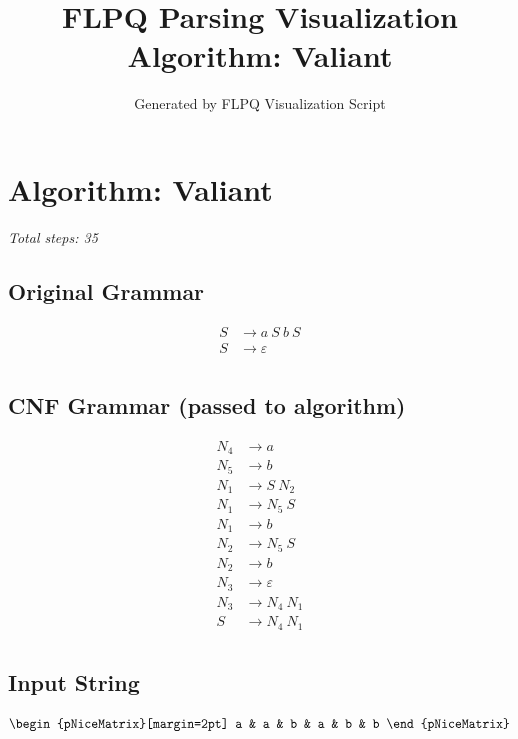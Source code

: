 \documentclass[12pt]{article}
\title{FLPQ Parsing Visualization\\Algorithm: Valiant}
\author{Generated by FLPQ Visualization Script}
\date{}
\begin{document}
\maketitle
\tableofcontents

\section*{Algorithm: Valiant}
\textit{Total steps: 35}\\
\subsection*{Original Grammar}
\begin{center}
\begin{align*}S &\rightarrow a\ S\ b\ S \\
S &\rightarrow \varepsilon \\
\end{align*}
\end{center}

\subsection*{CNF Grammar (passed to algorithm)}
\begin{center}
\begin{align*}N_{4} &\rightarrow a \\
N_{5} &\rightarrow b \\
N_{1} &\rightarrow S\ N_{2} \\
N_{1} &\rightarrow N_{5}\ S \\
N_{1} &\rightarrow b \\
N_{2} &\rightarrow N_{5}\ S \\
N_{2} &\rightarrow b \\
N_{3} &\rightarrow \varepsilon \\
N_{3} &\rightarrow N_{4}\ N_{1} \\
S &\rightarrow N_{4}\ N_{1} \\
\end{align*}
\end{center}

\subsection*{Input String}
\begin{center}
\[
\begin{pNiceMatrix}[margin=2pt] a & a & b & a & b & b \end{pNiceMatrix}
\]
\end{center}
\end{document}
